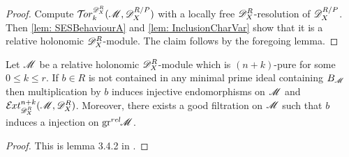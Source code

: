 \begin{proof}
  Compute $\Tr{\D_X^R}{k}(\M, \D_X^{R/P})$ with a locally free $\mathscr{D}_X^R$-resolution of $\mathscr{D}_X^{R/P}$.
  Then \cref{lem: SESBehaviourA} and \cref{lem: InclusionCharVar} show that it is a relative holonomic $\mathscr{D}_X^R$-module.
  The claim follows by the foregoing lemma.
\end{proof}
\begin{lemma}\label{lem: NotBernsteinInjectiveAutomorphism}
  Let $\mathscr{M}$ be a relative holonomic $\mathscr{D}_X^R$-module which is $(n+k)$-pure for some $0\leq k \leq r$. If $b\in R$ is not contained in any minimal prime ideal containing $B_{\mathscr{M}}$ then multiplication by $b$ induces injective endomorphisms on $\mathscr{M}$ and $\Ex{\D_X^R}{n+k}(\M,\D_X^R)$. Moreover, there exists a good filtration on $\mathscr{M}$ such that $b$ induces a injection on $\operatorname{gr}^{rel}\mkern-5mu \mathscr{M}$.
\end{lemma}
\begin{proof}
  This is lemma 3.4.2 in \cite{budur2019zero}.
\end{proof}
